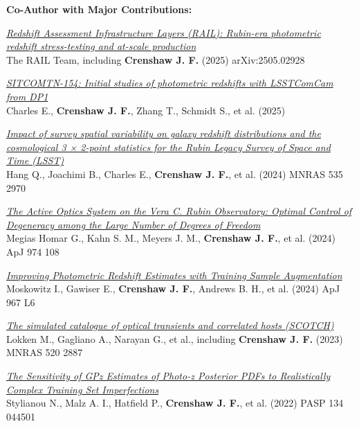 \textbf{Co-Author with Major Contributions:}
\begin{etaremune}
\item \href{https://ui.adsabs.harvard.edu/abs/2025arXiv250502928T}{\textit{Redshift Assessment Infrastructure Layers (RAIL): Rubin-era photometric redshift stress-testing and at-scale production}} \\ 
The RAIL Team, including \textbf{Crenshaw J. F.} (2025) 
arXiv:2505.02928 

\item \href{https://ui.adsabs.harvard.edu/abs/2025rubn.rept...35C}{\textit{SITCOMTN-154: Initial studies of photometric redshifts with LSSTComCam from DP1}} \\ 
Charles E., \textbf{Crenshaw J. F.}, Zhang T., Schmidt S., et al. (2025) 

\item \href{https://ui.adsabs.harvard.edu/abs/2024MNRAS.535.2970H}{\textit{Impact of survey spatial variability on galaxy redshift distributions and the cosmological 3 × 2-point statistics for the Rubin Legacy Survey of Space and Time (LSST)}} \\ 
Hang Q., Joachimi B., Charles E., \textbf{Crenshaw J. F.}, et al. (2024) 
MNRAS 535 2970 

\item \href{https://ui.adsabs.harvard.edu/abs/2024ApJ...974..108M}{\textit{The Active Optics System on the Vera C. Rubin Observatory: Optimal Control of Degeneracy among the Large Number of Degrees of Freedom}} \\ 
Megias Homar G., Kahn S. M., Meyers J. M., \textbf{Crenshaw J. F.}, et al. (2024) 
ApJ 974 108 

\item \href{https://ui.adsabs.harvard.edu/abs/2024ApJ...967L...6M}{\textit{Improving Photometric Redshift Estimates with Training Sample Augmentation}} \\ 
Moskowitz I., Gawiser E., \textbf{Crenshaw J. F.}, Andrews B. H., et al. (2024) 
ApJ 967 L6 

\item \href{https://ui.adsabs.harvard.edu/abs/2023MNRAS.520.2887L}{\textit{The simulated catalogue of optical transients and correlated hosts (SCOTCH)}} \\ 
Lokken M., Gagliano A., Narayan G., et al., including \textbf{Crenshaw J. F.} (2023) 
MNRAS 520 2887 

\item \href{https://ui.adsabs.harvard.edu/abs/2022PASP..134d4501S}{\textit{The Sensitivity of GPz Estimates of Photo-z Posterior PDFs to Realistically Complex Training Set Imperfections}} \\ 
Stylianou N., Malz A. I., Hatfield P., \textbf{Crenshaw J. F.}, et al. (2022) 
PASP 134 044501 


\end{etaremune}
